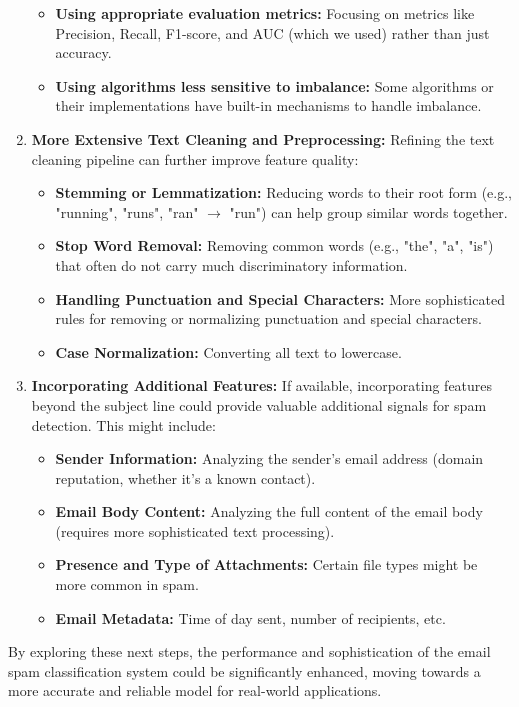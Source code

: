 \documentclass[12pt,letterpaper]{article}
\begin{document}
\begin{enumerate}
\begin{itemize}
        \item \textbf{Using appropriate evaluation metrics:} Focusing on metrics like Precision, Recall, F1-score, and AUC (which we used) rather than just accuracy.
        
        \item \textbf{Using algorithms less sensitive to imbalance:} Some algorithms or their implementations have built-in mechanisms to handle imbalance.
    \end{itemize}
    
    \item \textbf{More Extensive Text Cleaning and Preprocessing:} Refining the text cleaning pipeline can further improve feature quality:
    \begin{itemize}
        \item \textbf{Stemming or Lemmatization:} Reducing words to their root form (e.g., "running", "runs", "ran" $\rightarrow$ "run") can help group similar words together.
        
        \item \textbf{Stop Word Removal:} Removing common words (e.g., "the", "a", "is") that often do not carry much discriminatory information.
        
        \item \textbf{Handling Punctuation and Special Characters:} More sophisticated rules for removing or normalizing punctuation and special characters.
        
        \item \textbf{Case Normalization:} Converting all text to lowercase.
    \end{itemize}
    
    \item \textbf{Incorporating Additional Features:} If available, incorporating features beyond the subject line could provide valuable additional signals for spam detection. This might include:
    \begin{itemize}
        \item \textbf{Sender Information:} Analyzing the sender's email address (domain reputation, whether it's a known contact).
        
        \item \textbf{Email Body Content:} Analyzing the full content of the email body (requires more sophisticated text processing).
        
        \item \textbf{Presence and Type of Attachments:} Certain file types might be more common in spam.
        
        \item \textbf{Email Metadata:} Time of day sent, number of recipients, etc.
    \end{itemize}
\end{enumerate}

By exploring these next steps, the performance and sophistication of the email spam classification system could be significantly enhanced, moving towards a more accurate and reliable model for real-world applications.
\end{document}
